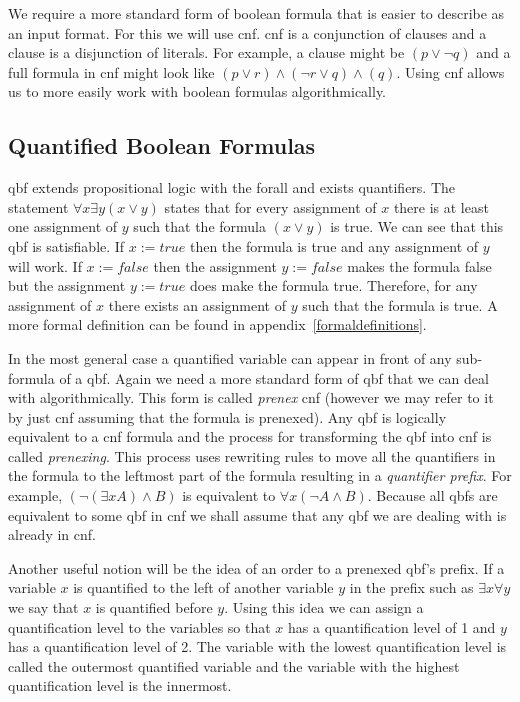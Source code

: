 We require a more standard form of boolean formula that is easier to describe as an input format. For this we will use \gls{cnf}. \Gls{cnf} is a conjunction of clauses and a clause is a disjunction of literals. For example, a clause might be $(p \lor \neg q)$ and a full formula in \gls{cnf} might look like $(p \lor r) \land (\neg r \lor q) \land (q)$. Using \gls{cnf} allows us to more easily work with boolean formulas algorithmically.

\subsection{Quantified Boolean Formulas} \label{qbf}
\Gls{qbf} extends propositional logic with the \gls{forall} and \gls{exists} quantifiers. The statement $\forall x \exists y (x \lor y)$ states that for every assignment of $x$ there is at least one assignment of $y$ such that the formula $(x \lor y)$ is true. We can see that this \gls{qbf} is satisfiable. If $x := true$ then the formula is true and any assignment of $y$ will work. If $x := false$ then the assignment $y := false$ makes the formula false but the assignment $y := true$ does make the formula true. Therefore, for any assignment of $x$ there exists an assignment of $y$ such that the formula is true. A more formal definition can be found in appendix~\ref{formaldefinitions}.

In the most general case a quantified variable can appear in front of any sub-formula of a \gls{qbf}. Again we need a more standard form of \gls{qbf} that we can deal with algorithmically. This form is called \textit{prenex} \gls{cnf} (however we may refer to it by just \gls{cnf} assuming that the formula is prenexed). Any \gls{qbf} is logically equivalent to a \gls{cnf} formula and the process for transforming the \gls{qbf} into \gls{cnf} is called \textit{prenexing}. This process uses rewriting rules to move all the quantifiers in the formula to the leftmost part of the formula resulting in a \textit{quantifier prefix}. For example, $(\neg (\exists x A) \land B)$ is equivalent to $\forall x (\neg A \land B)$. Because all \glspl{qbf} are equivalent to some \gls{qbf} in \gls{cnf} we shall assume that any \gls{qbf} we are dealing with is already in \gls{cnf}.

Another useful notion will be the idea of an order to a prenexed \gls{qbf}'s prefix. If a variable $x$ is quantified to the left of another variable $y$ in the prefix such as $\exists x \forall y$ we say that $x$ is quantified before $y$. Using this idea we can assign a quantification level to the variables so that $x$ has a quantification level of 1 and $y$ has a quantification level of 2. The variable with the lowest quantification level is called the outermost quantified variable and the variable with the highest quantification level is the innermost.

